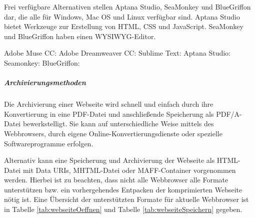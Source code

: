 Frei verfügbare Alternativen stellen Aptana Studio, SeaMonkey und  BlueGriffon dar, die alle für Windows, Mac OS und Linux verfügbar sind. Aptana Studio bietet Werkzeuge zur Erstellung von HTML, CSS und JavaScript. SeaMonkey und BlueGriffon haben einen WYSIWYG-Editor.

\begin{flushleft}
	Adobe Muse CC: 
	Adobe Dreamweaver CC: 
	Sublime Text: 
	Aptana Studio: 
	Seamonkey: 
	BlueGriffon: 
\end{flushleft}


\subparagraph{Archivierungsmethoden}

Die Archivierung einer Webseite wird schnell und einfach durch ihre Konvertierung in eine PDF-Datei und anschließende Speicherung als PDF/A-Datei bewerkstelligt. Sie kann auf unterschiedliche Weise mittels des Webbrowsers, durch eigene Online-Konvertierungsdienste oder spezielle Softwareprogramme erfolgen. 

Alternativ kann eine Speicherung und Archivierung der Webseite als HTML-Datei mit Data URIs, MHTML-Datei oder MAFF-Container vorgenommen werden. Hierbei ist zu beachten, dass nicht alle Webbrowser alle Formate unterstützen bzw. ein vorhergehendes Entpacken der komprimierten Webseite nötig ist. Eine Übersicht der unterstützten Formate für aktuelle Webbrowser ist in Tabelle \ref{tab:webseiteOeffnen} und Tabelle \ref{tab:webseiteSpeichern} gegeben.

